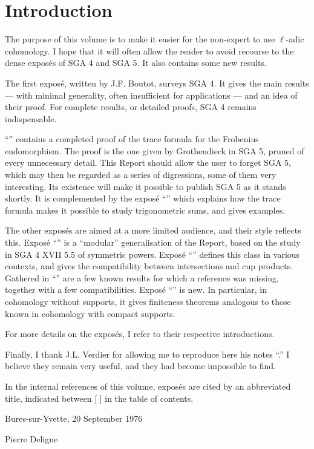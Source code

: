 
\chapter*{Introduction}

The purpose of this volume is to make it easier for the non-expert to use
$\ell$-adic cohomology. I hope that it will often allow the reader to avoid
recourse to the dense expos\'es of SGA 4 and SGA 5. It also contains some new
results.

The first expos\'e, written by J.F. Boutot, surveys SGA 4. It gives the main
results --- with minimal generality, often insufficient for applications ---
and an idea of their proof. For complete results, or detailed proofs, SGA 4
remains indispensable.

``'' contains a completed proof of the trace formula for the
Frobenius endomorphism. The proof is the one given by Grothendieck in SGA 5,
pruned of every unnecessary detail. This Report should allow the user to
forget SGA 5, which may then be regarded as a series of digressions, some of
them very interesting. Its existence will make it possible to publish SGA 5
as it stands shortly. It is complemented by the expos\'e ``''
which explains how the trace formula makes it possible to study
trigonometric sums, and gives examples.

The other expos\'es are aimed at a more limited audience, and their style
reflects this. Expos\'e ``'' is a ``modular'' generalisation of
the Report, based on the study in SGA 4 XVII 5.5 of symmetric powers.
Expos\'e ``'' defines this class in various contexts, and gives
the compatibility between intersections and cup products. Gathered in
``'' are a few known results for which a reference was missing,
together with a few compatibilities. Expos\'e ``'' is new. In
particular, in cohomology without supports, it gives finiteness theorems
analogous to those known in cohomology with compact supports.

For more details on the expos\'es, I refer to their respective
introductions.

Finally, I thank J.L. Verdier for allowing me to reproduce here his notes
``.'' I believe they remain very useful, and they had become
impossible to find.

In the internal references of this volume, expos\'es are cited by an
abbreviated title, indicated between [ ] in the table of contents.

\vspace{20pt}
Bures-sur-Yvette, 20 September 1976

\vspace{5pt}
Pierre Deligne
